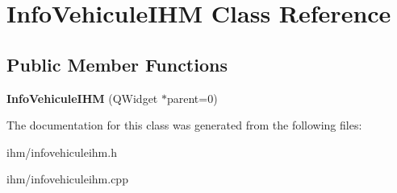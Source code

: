 \section{\-Info\-Vehicule\-I\-H\-M \-Class \-Reference}
\label{class_info_vehicule_i_h_m}
\subsection*{\-Public \-Member \-Functions}
\begin{DoxyCompactItemize}
\item 
{\bfseries \-Info\-Vehicule\-I\-H\-M} (\-Q\-Widget $\ast$parent=0)\label{class_info_vehicule_i_h_m_a9776c8d9500375abdbbf7033d8b0ad08}

\end{DoxyCompactItemize}


\-The documentation for this class was generated from the following files\-:\begin{DoxyCompactItemize}
\item 
ihm/infovehiculeihm.\-h\item 
ihm/infovehiculeihm.\-cpp\end{DoxyCompactItemize}
